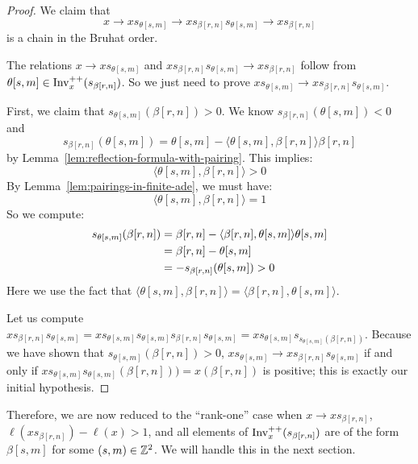 \documentclass[10pt]{amsart}
\begin{document}
\begin{proof}
We claim that
\begin{equation}\label{eq:12}
x \rightarrow x s_{\theta[s,m]} \rightarrow x s_{\beta[r,n]} s_{\theta[s,m]} \rightarrow x s_{\beta[r,n]}
\end{equation}
is a chain in the Bruhat order.

The relations $x \rightarrow x s_{\theta[s,m]}$ and $x s_{\beta[r,n]} s_{\theta[s,m]} \rightarrow x s_{\beta[r,n]}$ follow from $\theta[s,m] \in \operatorname{Inv}^{++}_x(s_{\beta[r,n]})$. So we just need to prove $x s_{\theta[s,m]} \rightarrow x s_{\beta[r,n]} s_{\theta[s,m]} $.

First, we claim that $s_{\theta[s,m]}(\beta[r,n]) > 0$. We know $s_{\beta[r,n]}(\theta[s,m]) < 0$ and
\begin{equation}\label{eq:13}
s_{\beta[r,n]}(\theta[s,m]) = \theta[s,m] - \langle \theta[s,m], \beta[r,n] \rangle \beta[r,n]
\end{equation}
by Lemma~\ref{lem:reflection-formula-with-pairing}. This implies:
\begin{equation}\label{eq:14}
\langle \theta[s,m], \beta[r,n] \rangle > 0
\end{equation}
By Lemma~\ref{lem:pairings-in-finite-ade}, we must have:
\begin{equation}\label{eq:10}
\langle \theta[s,m], \beta[r,n] \rangle = 1
\end{equation}
So we compute:
\begin{align}\label{eq:20}
s_{\theta[s,m]}(\beta[r,n]) &= \beta[r,n] - \langle \beta[r,n], \theta[s,m] \rangle \theta[s,m]\\
&= \beta[r,n] - \theta[s,m]\notag\\
&= - s_{\beta[r,n]}(\theta[s,m]) > 0\notag
\end{align}
Here we use the fact that $ \langle \theta[s,m], \beta[r,n] \rangle = \langle \beta[r,n], \theta[s,m] \rangle$.

Let us compute $x s_{\beta[r,n]} s_{\theta[s,m]} = x s_{\theta[s,m]} s_{\theta[s,m]} s_{\beta[r,n]} s_{\theta[s,m]} = x s_{\theta[s,m]} s_{s_{\theta[s,m]}(\beta[r,n])}$. Because we have shown that $s_{\theta[s,m]}(\beta[r,n]) > 0$, $x s_{\theta[s,m]} \rightarrow x s_{\beta[r,n]} s_{\theta[s,m]} $ if and only if $x s_{\theta[s,m]} s_{\theta[s,m]}(\beta[r,n])) = x(\beta[r,n])$ is positive; this is exactly our initial hypothesis.
\end{proof}

Therefore, we are now reduced to the ``rank-one'' case when $x \rightarrow x s_{\beta[r,n]}$, $\ell(x s_{\beta[r,n]}) - \ell(x) > 1$, and all elements of $\operatorname{Inv}^{++}_x(s_{\beta[r,n]})$ are of the form $\beta[s,m]$ for some $(s,m) \in \mathbb{Z}^2$. We will handle this in the next section.
\end{document}
